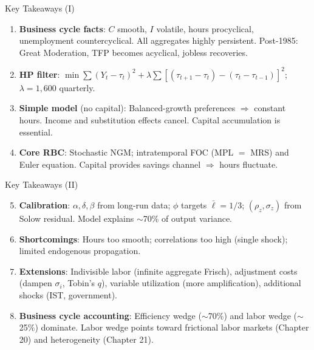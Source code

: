 \documentclass[blue]{beamer}
\begin{document}
\begin{frame}{Key Takeaways (I)}
	\begin{enumerate}
		\item \textbf{Business cycle facts}: $C$ smooth, $I$ volatile, hours procyclical, unemployment countercyclical. All aggregates highly persistent. Post-1985: Great Moderation, TFP becomes acyclical, jobless recoveries.
		
		\item \textbf{HP filter}: $\min \sum (Y_t - \tau_t)^2 + \lambda \sum [(\tau_{t+1}-\tau_t) - (\tau_t-\tau_{t-1})]^2$; $\lambda = 1{,}600$ quarterly.
		
		\item \textbf{Simple model} (no capital): Balanced-growth preferences $\Rightarrow$ constant hours. Income and substitution effects cancel. Capital accumulation is essential.
		
		\item \textbf{Core RBC}: Stochastic NGM; intratemporal FOC (MPL $=$ MRS) and Euler equation. Capital provides savings channel $\Rightarrow$ hours fluctuate.
	\end{enumerate}
\end{frame}

\begin{frame}{Key Takeaways (II)}
	\begin{enumerate}
		\setcounter{enumi}{4}
		\item \textbf{Calibration}: $\alpha, \delta, \beta$ from long-run data; $\phi$ targets $\bar{\ell} = 1/3$; $(\rho_z, \sigma_z)$ from Solow residual. Model explains $\sim$70\% of output variance.
		
		\item \textbf{Shortcomings}: Hours too smooth; correlations too high (single shock); limited endogenous propagation.
		
		\item \textbf{Extensions}: Indivisible labor (infinite aggregate Frisch), adjustment costs (dampen $\sigma_i$, Tobin's $q$), variable utilization (more amplification), additional shocks (IST, government).
		
		\item \textbf{Business cycle accounting}: Efficiency wedge ($\sim$70\%) and labor wedge ($\sim$25\%) dominate. Labor wedge points toward frictional labor markets (Chapter 20) and heterogeneity (Chapter 21).
	\end{enumerate}
\end{frame}
	
\end{document}
